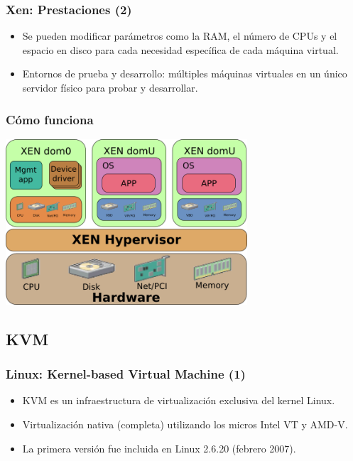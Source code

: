 \documentclass{beamer}
\begin{document}

\begin{frame}
\frametitle{Xen: Prestaciones (2)}
\begin{itemize}

\item Se pueden modificar parámetros como la RAM, el número de CPUs y el espacio en disco para cada necesidad específica de cada máquina virtual.
\item Entornos de prueba y desarrollo: múltiples máquinas virtuales en un único servidor físico para probar y desarrollar.
\end{itemize}

\end{frame}



\begin{frame}
\frametitle{Cómo funciona}
\begin{center}
\includegraphics[width=9cm]{figs/XEN-schema.png}
\end{center}
\end{frame}



\subsection{KVM}


\begin{frame}
\frametitle{Linux: Kernel-based Virtual Machine (1)}

\begin{itemize}
\item KVM es un infraestructura de virtualización exclusiva del kernel Linux.
\item Virtualización nativa (completa) utilizando los micros Intel VT y AMD-V.
\item La primera versión fue incluida en Linux 2.6.20 (febrero 2007).
\end{itemize}

\end{frame}
\end{document}
